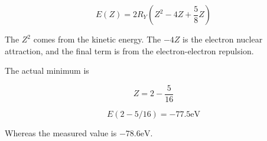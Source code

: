 \begin{equation}\label{eqn:qmTwoL2:670}
E(Z) = 2 R_Y \left( Z^2 - 4 Z + \frac{5}{8} Z \right)
\end{equation}

The $Z^2$ comes from the kinetic energy.  The $-4 Z$ is the electron nuclear attraction, and the final term is from the electron-electron repulsion.

The actual minimum is

\begin{equation}\label{eqn:qmTwoL2:690}
Z = 2 - \frac{5}{16}
\end{equation}

\begin{equation}\label{eqn:qmTwoL2:710}
E(2 - 5/16) = -77.5 \text{eV}
\end{equation}

Whereas the measured value is $-78.6 \text{eV}$.

\EndArticle
